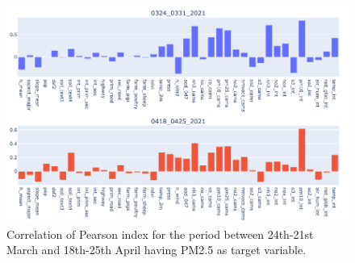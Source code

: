 \begin{figure}[H]
    \centering
    \includegraphics[scale=0.45]{src/images/tests/correlations_pm25.png}
    \caption{Correlation of Pearson index for the period between 24th-21st March and 18th-25th April having PM2.5 as target variable.}
    \label{fig:overview}
\end{figure}

